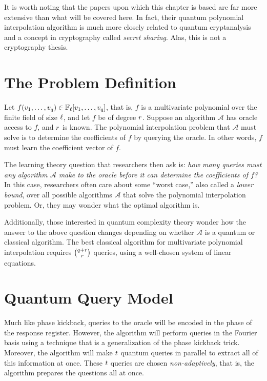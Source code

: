 \documentclass[12pt,twoside]{reedthesis}
\theoremstyle{definition}
\newcommand{\F}{\mathbb{F}}
\begin{document}
It is worth noting that the papers upon which this chapter is based are far more extensive than what will be covered here. In fact, their quantum polynomial interpolation algorithm is much more closely related to quantum cryptanalysis and a concept in cryptography called \textit{secret sharing}. Alas, this is not a cryptography thesis.

\section{The Problem Definition}
Let $f(\inv1, \ldots, \inv\numin)\in \F_\fsize[\inv1, \ldots, \inv\numin]$, that is, $f$ is a multivariate polynomial over the finite field of size $\ell$, and let $f$ be of degree $r$. Suppose an algorithm $\mathcal{A}$ has oracle access to $f$, and $r$ is known. The polynomial interpolation problem that $\mathcal{A}$ must solve is to determine the coefficients of $f$ by querying the oracle. In other words, $f$ must learn the coefficient vector of $f$.

The learning theory question that researchers then ask is: \textit{how many queries must any algorithm $\mathcal{A}$ make to the oracle before it can determine the coefficients of $f$?} In this case, researchers often care about some ``worst case,'' also called a \textit{lower bound}, over all possible algorithms $\mathcal{A}$ that solve the polynomial interpolation problem. Or, they may wonder what the optimal algorithm is. 

Additionally, those interested in quantum complexity theory wonder how the answer to the above question changes depending on whether $\mathcal{A}$ is a quantum or classical algorithm. The best classical algorithm for multivariate polynomial interpolation requires ${q+r \choose r}$ queries, using a well-chosen system of linear equations.

\section{Quantum Query Model}
Much like phase kickback, queries to the oracle will be encoded in the phase of the response register. However, the algorithm will perform queries in the Fourier basis using a technique that is a generalization of the phase kickback trick. Moreover, the algorithm will make $t$ quantum queries in parallel to extract all of this information at once. These $t$ queries are chosen \textit{non-adaptively}, that is, the algorithm prepares the questions all at once.
\end{document}
